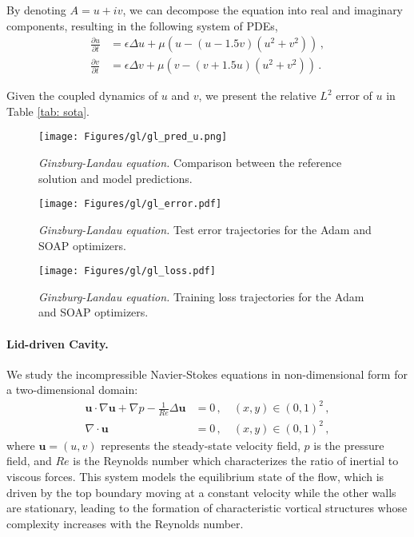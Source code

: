By denoting $A = u + i v$, we can decompose the equation into real and imaginary components, resulting in the following system of PDEs,
\begin{align*}
     \frac{\partial u}{\partial t} &= \epsilon \Delta u + \mu (u - (u-1.5 v) (u^2 + v^2))\,, \\
      \frac{\partial v}{\partial t} &= \epsilon \Delta v + \mu (v - (v + 1.5 u) (u^2 + v^2))\,.
\end{align*}

Given the coupled dynamics of $u$ and $v$, we present the relative $L^2$ error of $u$ in Table \ref{tab: sota}.


\begin{figure}
    \centering
    \texttt{[image: Figures/gl/gl\_pred\_u.png]}
\caption{{\em Ginzburg-Landau equation.} Comparison between the reference solution and model predictions.}
    \label{fig:gl_pred_u}
\end{figure}

\begin{figure}
    \centering
    \texttt{[image: Figures/gl/gl\_error.pdf]}
\caption{{\em Ginzburg-Landau equation.} Test error trajectories for the Adam and SOAP optimizers.}
    \label{fig:gl_error}
\end{figure}


\begin{figure}
    \centering
    \texttt{[image: Figures/gl/gl\_loss.pdf]}
 \caption{{\em Ginzburg-Landau equation.} Training loss trajectories for the  Adam and SOAP optimizers.}
    \label{fig:gl_loss}
\end{figure}


\paragraph{Lid-driven Cavity.} We study the incompressible Navier-Stokes equations in non-dimensional form for a two-dimensional domain:
\begin{align*}
    \mathbf{u} \cdot \nabla \mathbf{u}+\nabla p-\frac{1}{R e} \Delta \mathbf{u}&=0\,, \quad  (x,y) \in (0,1)^2\,, \\
    \nabla \cdot \mathbf{u}&=0\,, \quad  (x,y) \in (0,1)^2\,,
\end{align*}
where $\mathbf{u} = (u,v)$ represents the steady-state velocity field, $p$ is the pressure field, and $Re$ is the Reynolds number which characterizes the ratio of inertial to viscous forces.  This system models the equilibrium state of the flow, which is driven by the top boundary moving at a constant velocity while the other walls are stationary, leading to the formation of characteristic vortical structures whose complexity increases with the Reynolds number.


